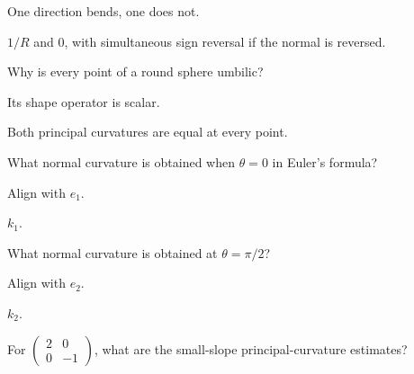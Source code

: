 \begin{hint}
One direction bends, one does not.
\end{hint}

\begin{solution}
\(1/R\) and \(0\), with simultaneous sign reversal if the normal is reversed.
\end{solution}

\begin{exercise}\label{exr:vii42-ped-02}
Why is every point of a round sphere umbilic?
\end{exercise}

\begin{hint}
Its shape operator is scalar.
\end{hint}

\begin{solution}
Both principal curvatures are equal at every point.
\end{solution}

\begin{exercise}\label{exr:vii42-ped-03}
What normal curvature is obtained when \(\theta=0\) in Euler's formula?
\end{exercise}

\begin{hint}
Align with \(e_1\).
\end{hint}

\begin{solution}
\(k_1\).
\end{solution}

\begin{exercise}\label{exr:vii42-ped-04}
What normal curvature is obtained at \(\theta=\pi/2\)?
\end{exercise}

\begin{hint}
Align with \(e_2\).
\end{hint}

\begin{solution}
\(k_2\).
\end{solution}

\begin{exercise}\label{exr:vii42-ped-05}
For \(\begin{pmatrix}2&0\\0&-1\end{pmatrix}\), what are the small-slope principal-curvature estimates?
\end{exercise}

